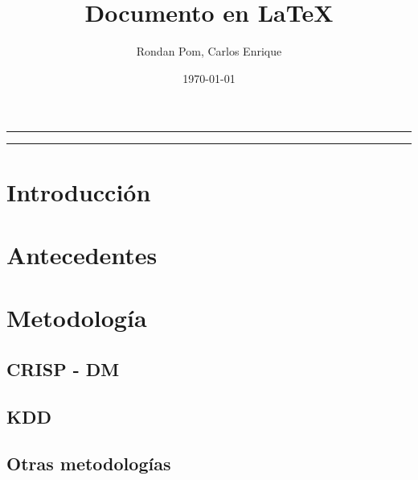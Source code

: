 \documentclass[10pt,a4paper]{article}
\author{Rondan Pom, Carlos Enrique}
\title{Documento en LaTeX}
\date{\today}
\begin{document}
	\maketitle
	\begin{center}
		\rule{15cm}{1pt}
		\begin{abstract}
			\lipsum[1]
		\end{abstract}
		\rule{15cm}{1pt}
	\end{center}
	\tableofcontents
	\vspace{1cm}
	\begin{multicols}{2}
		\section{Introducción}
		\lipsum[2-6]
		\section{Antecedentes}
		\lipsum[2-8]
		\section{Metodología}
		\subsection{CRISP - DM}
		\lipsum[2-6]
		\subsection{KDD}
		\lipsum[2-6]
		\subsection{Otras metodologías}
		\lipsum[2-6]
	\end{multicols}
\end{document}
